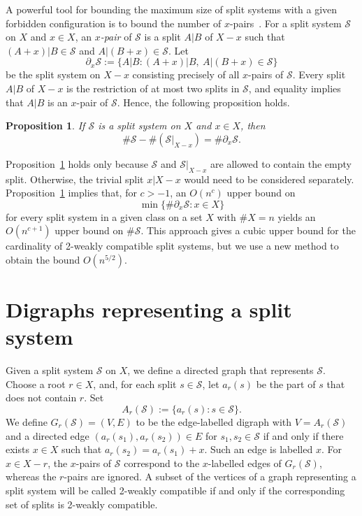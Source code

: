\documentclass[11pt]{article}
\newtheorem{proposition}{Proposition}
\newcommand{\cS}{\mathcal{S}}
\newcommand{\cA}{A}
\begin{document}
	A powerful tool for bounding the maximum size of split systems with a given forbidden configuration is to bound the number of $x$-pairs~\cite{DressKlucznikKoolenMoulton2001,DressKoolenMoulton2005,GrunewaldKoolenMoultonWu2012}. For a split system $\cS$ on $X$ and $x\in X$, an \emph{$x$-pair} of $\cS$ is a split $A|B$ of $X-x$ such that $(A+x)|B\in\cS$ and $A|(B+x)\in\cS$. Let
	\[
	\partial_x\cS:=\{A|B:(A+x)|B,\ A|(B+x)\in\cS\}
	\]
	be the split system on $X-x$ consisting precisely of all $x$-pairs of $\cS$. Every split $A|B$ of $X-x$ is the restriction of at most two splits in $\cS$, and equality implies that $A|B$ is an $x$-pair of $\cS$. Hence, the following proposition holds.
	
	\begin{proposition}\label{prop:x-pairs}
		If $\cS$ is a split system on $X$ and $x\in X$, then
		\begin{equation}\label{eq:x-pair-count}
			\#\cS-\#(\cS|_{X-x})=\#\partial_x\cS.
		\end{equation}
	\end{proposition}
	
	Proposition~\ref{prop:x-pairs} holds only because $\cS$ and $\cS|_{X-x}$ are allowed to contain the empty split. Otherwise, the trivial split $x|X-x$ would need to be considered separately. Proposition~\ref{prop:x-pairs} implies that, for $c>-1$, an $O(n^c)$ upper bound on
	\[
	\min\{\#\partial_x\cS:x\in X\}
	\]
	for every split system in a given class on a set $X$ with $\#X=n$ yields an $O(n^{c+1})$ upper bound on $\#\cS$. This approach gives a cubic upper bound for the cardinality of 2-weakly compatible split systems, but we use a new method to obtain the bound $O(n^{5/2})$.
	
	\section{Digraphs representing a split system}
	
	Given a split system $\cS$ on $X$, we define a directed graph that represents $\cS$. Choose a root $r\in X$, and, for each split $s\in\cS$, let $a_r(s)$ be the part of $s$ that does not contain $r$. Set
	\[
	\cA_r(\cS):=\{a_r(s):s\in\cS\}.
	\]
	We define $G_r(\cS)=(V,E)$ to be the edge-labelled digraph with $V=\cA_r(\cS)$ and a directed edge $(a_r(s_1),a_r(s_2))\in E$ for $s_1,s_2\in\cS$ if and only if there exists $x\in X$ such that $a_r(s_2)=a_r(s_1)+x$. Such an edge is labelled $x$. For $x\in X-r$, the $x$-pairs of $\cS$ correspond to the $x$-labelled edges of $G_r(\cS)$, whereas the $r$-pairs are ignored. A subset of the vertices of a graph representing a split system will be called 2-weakly compatible if and only if the corresponding set of splits is 2-weakly compatible.
	
\end{document}
